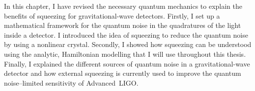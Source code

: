 In this chapter, I have revised the necessary quantum mechanics to explain the benefits of squeezing for gravitational-wave detectors. %
Firstly, I set up a mathematical framework for the quantum noise in the quadratures of the light inside a detector. I introduced the idea of squeezing to reduce the quantum noise by using a nonlinear crystal.  %
Secondly, I showed how squeezing can be understood using the analytic, Hamiltonian modelling that I will use throughout this thesis. %
Finally, I explained the different sources of quantum noise in a gravitational-wave detector and how external squeezing is currently used to improve the quantum noise--limited sensitivity of Advanced~LIGO. %


